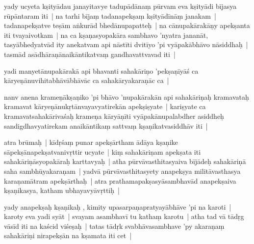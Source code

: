 \documentclass[article,12pt,a4paper]{memoir}%
\newcounter{parCount}
\begin{document}
	  \pstart \leavevmode%
	\label{thakur75-80.4}yady ucyeta kṣityādau janayitavye tadupādānaṃ pūrvam eva kṣityādi bījasya rūpāntaram iti | na tarhi bījaṃ tadanapekṣaṃ kṣityādīnāṃ janakam | tadanapekṣatve teṣām aṅkurād bhedānupapatteḥ | na cānupakārakāṇy apekṣanta iti tvayaivotkam | na ca kṣaṇasyopakāra sambhavo 'nyatra jananāt, tasyābhedyatvād ity anekatvam api nāstīti dvitīyo 'pi vyāpakābhāvo nāsiddhaḥ | tasmād asādhāraṇānaikāntikatvaṃ gandhavattvavad iti |
	{}
	\pend%
      

	  \pstart \leavevmode%
	\label{thakur75-80.9}yadi manyetānupakārakā api bhavanti sahakāriṇo 'pekṣaṇīyāś ca kāryeṇānuvihitabhāvābhāvāc ca sahakāryakaraṇāc ca |
	{}
	\pend%
      

	  \pstart \leavevmode%
	\label{thakur75-80.11}nanv anena krameṇākṣaṇiko 'pi bhāvo 'nupakārakān api sahakāriṇaḥ kramavataḥ kramavat kāryeṇānukṛtānvayavyatirekān apekṣiṣyate | kariṣyate ca kramavatsahakārivaśaḥ krameṇa kāryāṇīti vyāpakānupalabdher asiddheḥ sandigdhavyatirekam anaikāntikaṃ sattvaṃ kṣaṇikatvasiddhāv iti |
	{}
	\pend%
      

	  \pstart \leavevmode%
	\label{thakur75-80.15}atra brūmaḥ | kīdṛśaṃ punar apekṣārtham ādāya kṣaṇike sāpekṣānapekṣatvanivṛttir ucyate | kiṃ sahakāriṇam apekṣata iti sahakāriṇāsyopakāraḥ karttavyaḥ | atha pūrvāvasthitasyaiva bījādeḥ sahakāriṇā saha sambhūyakaraṇam | yadvā pūrvāvasthitasyety anapekṣya militāvasthasya karaṇamātram apekṣārthaḥ | atra prathamapakṣasyāsambhavād anapekṣaiva kṣaṇikasya, katham ubhayavyāvṛttiḥ | 
	{}
	\pend%
      

	  \pstart \leavevmode%
	\label{thakur75-80.19}yady anapekṣaḥ kṣaṇikaḥ , kimity upasarpaṇapratyayābhāve 'pi na karoti | karoty eva yadi syāt | svayam asambhavī tu kathaṃ karotu | atha tad vā tādṛg vāsīd iti na kaścid viśeṣaḥ | tatas tādṛk svabhāvasambhave 'py akaraṇaṃ sahakāriṇi nirapekṣān na kṣamata iti cet |
	{}
	\pend%
      
\end{document}
